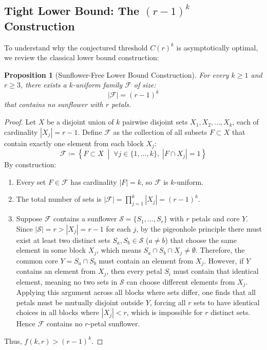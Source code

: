 \documentclass[11pt,a4paper]{article}
\newtheorem{proposition}[theorem]{Proposition}
\theoremstyle{definition}
\begin{document}
\subsection{\texorpdfstring{Tight Lower Bound: The $(r-1)^k$ Construction}{Tight Lower Bound: The (r-1)\textasciicircum k Construction}}
To understand why the conjectured threshold $C(r)^k$ is asymptotically optimal, we review the classical lower bound construction:

\begin{proposition}[Sunflower-Free Lower Bound Construction]\label{prop:lower_bound}
For every $k \ge 1$ and $r \ge 3$, there exists a $k$-uniform family $\mathcal{F}$ of size:
\begin{equation}\label{eq:lower_bound_size}
|\mathcal{F}| = (r - 1)^k
\end{equation}
that contains no sunflower with $r$ petals.
\end{proposition}

\begin{proof}
Let $X$ be a disjoint union of $k$ pairwise disjoint sets $X_1, X_2, \dots, X_k$, each of cardinality $|X_j| = r - 1$.
Define $\mathcal{F}$ as the collection of all subsets $F \subset X$ that contain exactly one element from each block $X_j$:
\begin{equation}
\mathcal{F} \coloneqq \left\{ F \subset X \;\middle|\; \forall j \in \{1, \dots, k\}, \; |F \cap X_j| = 1 \right\}
\end{equation}
By construction:
\begin{enumerate}
    \item Every set $F \in \mathcal{F}$ has cardinality $|F| = k$, so $\mathcal{F}$ is $k$-uniform.
    \item The total number of sets is $|\mathcal{F}| = \prod_{j=1}^k |X_j| = (r - 1)^k$.
    \item Suppose $\mathcal{F}$ contains a sunflower $\mathcal{S} = \{S_1, \dots, S_r\}$ with $r$ petals and core $Y$.
    Since $|\mathcal{S}| = r > |X_j| = r - 1$ for each $j$, by the pigeonhole principle there must exist at least two distinct sets $S_a, S_b \in \mathcal{S}$ ($a \ne b$) that choose the same element in some block $X_j$, which means $S_a \cap S_b \cap X_j \ne \emptyset$.
    Therefore, the common core $Y = S_a \cap S_b$ must contain an element from $X_j$.
    However, if $Y$ contains an element from $X_j$, then every petal $S_i$ must contain that identical element, meaning no two sets in $\mathcal{S}$ can choose different elements from $X_j$.
    Applying this argument across all blocks where sets differ, one finds that all petals must be mutually disjoint outside $Y$, forcing all $r$ sets to have identical choices in all blocks where $|X_j| < r$, which is impossible for $r$ distinct sets.
    Hence $\mathcal{F}$ contains no $r$-petal sunflower.
\end{enumerate}
Thus, $f(k, r) > (r - 1)^k$.
\end{proof}
\end{document}

